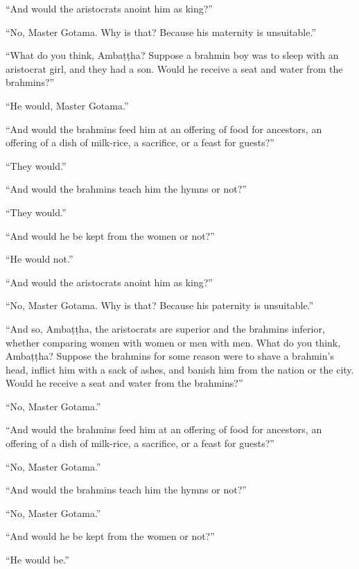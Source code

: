 \documentclass[12pt,openany]{book}%
\begin{document}
“And would the aristocrats anoint him as king?” 

“No, Master Gotama. Why is that? Because his maternity is unsuitable.” 

“What do you think, \textsanskrit{Ambaṭṭha}? Suppose a brahmin boy was to sleep with an aristocrat girl, and they had a son. Would he receive a seat and water from the brahmins?” 

“He would, Master Gotama.” 

“And would the brahmins feed him at an offering of food for ancestors, an offering of a dish of milk-rice, a sacrifice, or a feast for guests?” 

“They would.” 

“And would the brahmins teach him the hymns or not?” 

“They would.” 

“And would he be kept from the women or not?” 

“He would not.” 

“And would the aristocrats anoint him as king?” 

“No, Master Gotama. Why is that? Because his paternity is unsuitable.” 

“And so, \textsanskrit{Ambaṭṭha}, the aristocrats are superior and the brahmins inferior, whether comparing women with women or men with men. What do you think, \textsanskrit{Ambaṭṭha}? Suppose the brahmins for some reason were to shave a brahmin’s head, inflict him with a sack of ashes, and banish him from the nation or the city. Would he receive a seat and water from the brahmins?” 

“No, Master Gotama.” 

“And would the brahmins feed him at an offering of food for ancestors, an offering of a dish of milk-rice, a sacrifice, or a feast for guests?” 

“No, Master Gotama.” 

“And would the brahmins teach him the hymns or not?” 

“No, Master Gotama.” 

“And would he be kept from the women or not?” 

“He would be.” 
\end{document}
